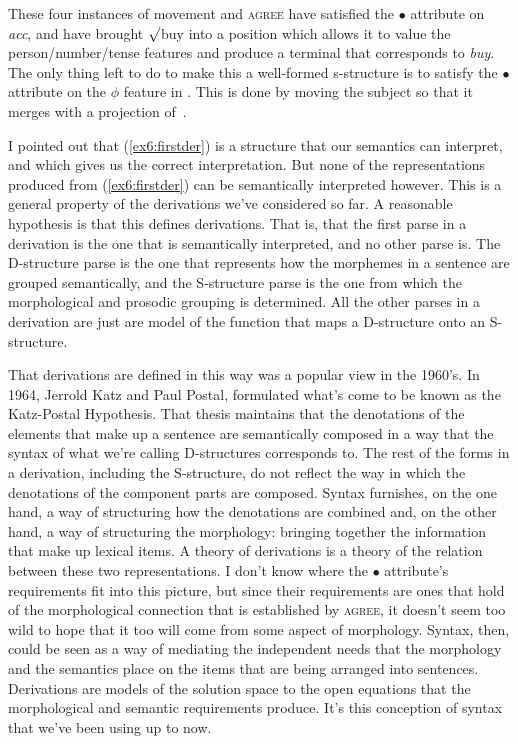 These four instances of movement and \textsc{agree} have satisfied the $\bullet$ attribute on \emph{acc}, and have brought $\surd$buy into a position which allows it to value the person/number/tense features and produce a terminal that corresponds to \emph{buy}. The only thing left to do to make this a well-formed s-structure is to satisfy the $\bullet$ attribute on the $\phi$ feature in . This is done by moving the subject so that it merges with a projection of~.

I pointed out that (\ref{ex6:firstder}) is a structure that our semantics can interpret, and which gives us the correct interpretation. But none of the representations produced from (\ref{ex6:firstder}) can be semantically interpreted however. This is a general property of the derivations we've considered so far. A reasonable hypothesis is that this defines derivations. That is, that the first parse in a derivation is the one that is semantically interpreted, and no other parse is. The D-structure parse is the one that represents how the morphemes in a sentence are grouped semantically, and the S-structure parse is the one from which the morphological and prosodic grouping is determined. All the other parses in a derivation are just are model of the function that maps a D-structure onto an S-structure. 

That derivations are defined in this way was a popular view in the 1960's. In 1964, Jerrold Katz and Paul Postal, formulated what's come to be known as the Katz-Postal Hypothesis.\nocite{Katz:1964} That thesis maintains that the denotations of the elements that make up a sentence are semantically composed in a way that the syntax of what we're calling D-structures corresponds to. The rest of the forms in a derivation, including the S-structure, do not reflect the way in which the denotations of the component parts are composed. Syntax furnishes, on the one hand, a way of structuring how the denotations are combined and, on the other hand, a way of structuring the morphology: bringing together the information that make up lexical items. A theory of derivations is a theory of the relation between these two representations. I don't know where the $\bullet$ attribute's requirements fit into this picture, but since their requirements are ones that hold of the morphological connection that is established by \textsc{agree}, it doesn't seem too wild to hope that it too will come from some aspect of morphology. Syntax, then, could be seen as a way of mediating the independent needs that the morphology and the semantics place on the items that are being arranged into sentences. Derivations are models of the solution space to the open equations that the morphological and semantic requirements produce. It's this conception of syntax that we've been using up to now.

